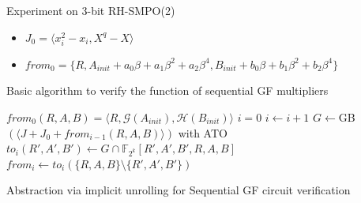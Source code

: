 \documentclass[xcolor=dvipsnames]{beamer}
\newcommand{\bi}{\begin{itemize}}
\newcommand{\ei}{\end{itemize}}
\begin{document}
\begin{frame}{\large{Experiment on 3-bit RH-SMPO(2)}}
\bi
\vspace{-3.45cm}
\item $J_0 = \langle x_i^2 - x_i, X^q - X\rangle$
\item $from_0 = \{R, A_{init}+a_0\beta+a_1\beta^2+a_2\beta^4,
B_{init}+b_0\beta+b_1\beta^2+b_2\beta^4\}$
\ei
\end{frame}
\begin{frame}{\large{Basic algorithm to verify the function of sequential GF multipliers}}
\begin{algorithm}[H] %
\SetAlgoNoLine

  $from_0(R,A,B) = \langle R, \mathcal{G}(A_{init}), \mathcal{H}(B_{init})\rangle$\;
  $i = 0$\;
  {
  	$i \gets i + 1$\;
	$G \gets$GB$( \langle J + J_0+ from_{i-1}(R,A,B) \rangle)$ with ATO\;
	\alert{$to_i(R',A',B')\gets G\cap \mathbb F_{2^k}[R',A',B',R,A,B]$}\;
	\alert{$from_i \gets to_i(\{R,A,B\}\setminus \{R',A',B'\})$}\;
  }
\caption {Abstraction via implicit unrolling for Sequential GF circuit verification}
\end{algorithm}
\end{frame}
\end{document}

